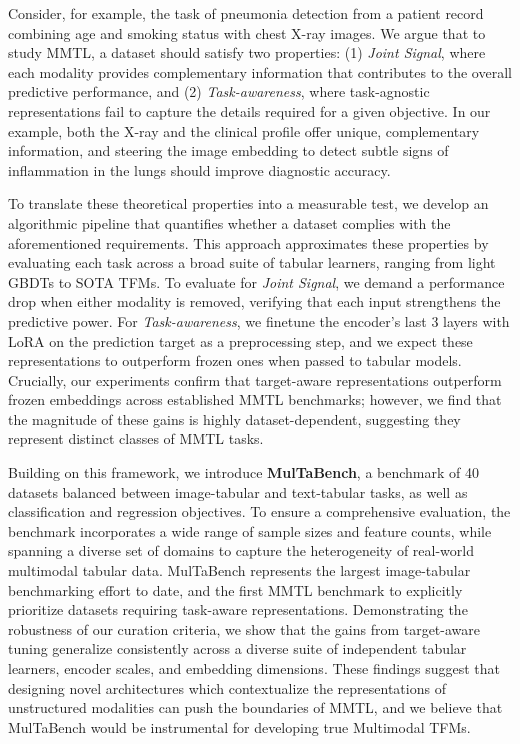 \documentclass{llmxive}
\begin{document}
Consider, for example, the task of pneumonia detection from a patient record combining age and smoking status with chest X-ray images. We argue that to study MMTL, a dataset should satisfy two properties: (1) \textit{Joint Signal}, where each modality provides complementary information that contributes to the overall predictive performance, and (2) \textit{Task-awareness}, where task-agnostic representations fail to capture the details required for a given objective. In our example, both the X-ray and the clinical profile offer unique, complementary information, and steering the image embedding to detect subtle signs of inflammation in the lungs should improve diagnostic accuracy.

To translate these theoretical properties into a measurable test, we develop an algorithmic pipeline that quantifies whether a dataset complies with the aforementioned requirements. This approach approximates these properties by evaluating each task across a broad suite of tabular learners, ranging from light GBDTs to SOTA TFMs. 
To evaluate for \textit{Joint Signal}, we demand a performance drop when either modality is removed, verifying that each input strengthens the predictive power. For \textit{Task-awareness}, we finetune the encoder's last 3 layers with LoRA \cite{hu_lora_2021} on the prediction target as a preprocessing step, and we expect these representations to outperform frozen ones when passed to tabular models. Crucially, our experiments confirm that target-aware representations outperform frozen embeddings across established MMTL benchmarks; however, we find that the magnitude of these gains is highly dataset-dependent, suggesting they represent distinct classes of MMTL tasks.

Building on this framework, we introduce \textbf{MulTaBench}, a benchmark of 40 datasets balanced between image-tabular and text-tabular tasks, as well as classification and regression objectives. To ensure a comprehensive evaluation, the benchmark incorporates a wide range of sample sizes and feature counts, while spanning a diverse set of domains to capture the heterogeneity of real-world multimodal tabular data. MulTaBench represents the largest image-tabular benchmarking effort to date, and the first MMTL benchmark to explicitly prioritize datasets requiring task-aware representations. Demonstrating the robustness of our curation criteria, we show that the gains from target-aware tuning generalize consistently across a diverse suite of independent tabular learners, encoder scales, and embedding dimensions. These findings suggest that designing novel architectures which contextualize the representations of unstructured modalities can push the boundaries of MMTL, and we believe that MulTaBench would be instrumental for developing true Multimodal TFMs. 
\end{document}
